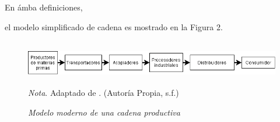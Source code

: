 \documentclass[stu, 12pt, letterpaper, donotrepeattitle, floatsintext, natbib]{apa7}
\begin{document}
\vspace{\baselineskip}
En ámba definiciones,\begin{justifying}
     el modelo simplificado de cadena es mostrado en la Figura 2.
\end{justifying}
\begin{figure}[H]
    \caption{\emph{Modelo moderno de una cadena productiva\\}}
    \centering
    \smallskip
    \includegraphics[width=16cm,height=2cm]{cadena.png}
    \bigskip
    \\\small\textit{Nota}. Adaptado de \cite{castro-2005}. %
    (Autoría Propia, s.f.)
\end{figure}
\vspace{\baselineskip}
\end{document}

